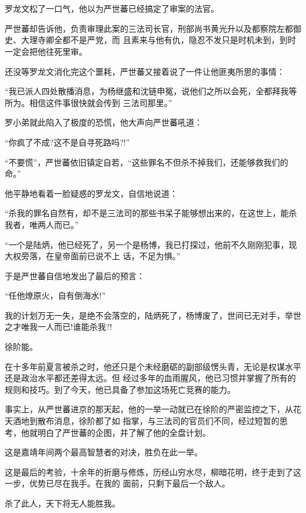 \documentclass[11pt,a4paper,onecolumn]{article}
\begin{document}
\section[\thesection]{}

罗龙文松了一口气，他以为严世蕃已经搞定了审案的法官。

严世蕃却告诉他，负责审理此案的三法司长官，刑部尚书黄光升以及都察院左都御史、大理寺卿全都不是严党，而
且素来与他有仇，隐忍不发只是时机未到，到时一定会把他往死里审。

还没等罗龙文消化完这个噩耗，严世蕃又接着说了一件让他匪夷所思的事情：

``我已派人四处散播消息，为杨继盛和沈链申冤，说他们之所以会死，全都拜我等所为。相信这件事很快就会传到
三法司那里。''

罗小弟就此陷入了极度的恐慌，他大声向严世蕃吼道：

``你疯了不成?这不是自寻死路吗?!''

``不要慌''，严世蕃依旧镇定自若，``这些罪名不但杀不掉我们，还能够救我们的命。''

他平静地看着一脸疑惑的罗龙文，自信地说道：

``杀我的罪名自然有，却不是三法司的那些书呆子能够想出来的，在这世上，能杀我者，唯两人而已。''

``一个是陆炳，他已经死了，另一个是杨博，我已打探过，他前不久刚刚犯事，现大权旁落，在皇帝面前已说不上
话，不足为惧。''

于是严世蕃自信地发出了最后的预言：

``任他燎原火，自有倒海水!''

我的计划万无一失，是绝不会落空的，陆炳死了，杨博废了，世间已无对手，举世之才唯我一人而已!谁能杀我?!

徐阶能。

在十多年前夏言被杀之时，他还只是个未经磨砺的副部级愣头青，无论是权谋水平还是政治水平都还差得太远。但
经过多年的血雨腥风，他已习惯并掌握了所有的规则和技巧。到了今天，他已具备了参加这场死亡竞赛的能力。

事实上，从严世蕃进京的那天起，他的一举一动就已在徐阶的严密监控之下，从花天酒地到散布消息，徐阶都了如
指掌，与三法司的官员们不同，经过短暂的思考，他就明白了严世蕃的企图，并了解了他的全盘计划。

这是嘉靖年间两个最高智慧者的对决，胜负在此一举。

这是最后的考验，十余年的折磨与修炼，历经山穷水尽，柳暗花明，终于走到了这一步，优势已尽在我手。在我的
面前，只剩下最后一个敌人。

杀了此人，天下将无人能胜我。

\section[\thesection]{}
\end{document}
